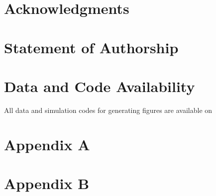 \documentclass[11pt]{article}
\begin{document}
 \section*{Acknowledgments}


 \section*{Statement of Authorship}
 
\section*{Data and Code Availability}
All data and simulation codes for generating figures are available on 



\newpage{}

\renewcommand{\theequation}{A\arabic{equation}}
\renewcommand{\thetable}{A\arabic{table}}
\renewcommand{\thefigure}{A\arabic{figure}}

\setcounter{figure}{0}
\setcounter{equation}{0}  %
\setcounter{table}{0}

\section*{Appendix A}


\section*{Appendix B}


\newpage{}

%
%


%
\end{document}
